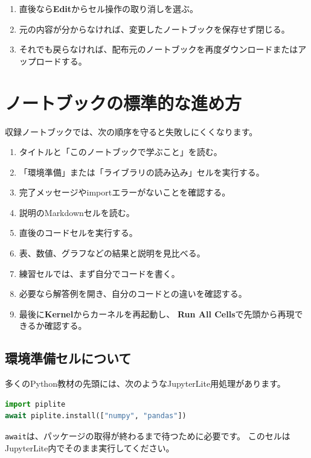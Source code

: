 \documentclass[a4paper,11pt]{ltjsarticle}
\newcommand{\menu}[1]{\textsf{\bfseries #1}}
\begin{document}
\begin{enumerate}
  \item 直後なら\menu{Edit}からセル操作の取り消しを選ぶ。
  \item 元の内容が分からなければ、変更したノートブックを保存せず閉じる。
  \item それでも戻らなければ、配布元のノートブックを再度ダウンロードまたはアップロードする。
\end{enumerate}

\section{ノートブックの標準的な進め方}

収録ノートブックでは、次の順序を守ると失敗しにくくなります。

\begin{enumerate}
  \item タイトルと「このノートブックで学ぶこと」を読む。
  \item 「環境準備」または「ライブラリの読み込み」セルを実行する。
  \item 完了メッセージやimportエラーがないことを確認する。
  \item 説明のMarkdownセルを読む。
  \item 直後のコードセルを実行する。
  \item 表、数値、グラフなどの結果と説明を見比べる。
  \item 練習セルでは、まず自分でコードを書く。
  \item 必要なら解答例を開き、自分のコードとの違いを確認する。
  \item 最後に\menu{Kernel}からカーネルを再起動し、
    \menu{Run All Cells}で先頭から再現できるか確認する。
\end{enumerate}

\subsection{環境準備セルについて}

多くのPython教材の先頭には、次のようなJupyterLite用処理があります。

\begin{lstlisting}[language=Python]
import piplite
await piplite.install(["numpy", "pandas"])
\end{lstlisting}

\texttt{await}は、パッケージの取得が終わるまで待つために必要です。
このセルはJupyterLite内でそのまま実行してください。
\end{document}
